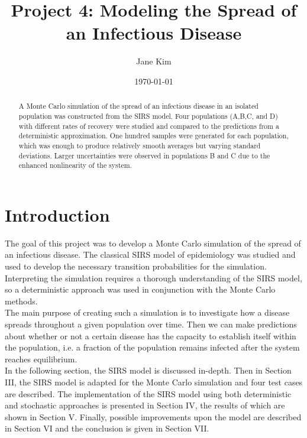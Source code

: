 \documentclass[prb,aps,twocolumn,showpacs,10pt]{revtex4-1}
\begin{document}
\title {Project 4: Modeling the Spread of an Infectious Disease}

\author{Jane Kim}
\date{\today}


\begin{abstract}
\vspace*{3mm}
A Monte Carlo simulation of the spread of an infectious disease in an isolated population was constructed from the SIRS model. Four populations (A,B,C, and D) with different rates of recovery were studied and compared to the predictions from a deterministic approximation. One hundred samples were generated for each population, which was enough to produce relatively smooth averages but varying standard deviations. Larger uncertainties were observed in populations B and C due to the enhanced nonlinearity of the system.
\end{abstract}

\maketitle

\section{Introduction}

The goal of this project was to develop a Monte Carlo simulation of the spread of an infectious disease. The classical SIRS model of epidemiology was studied and used to develop the necessary transition probabilities for the simulation. Interpreting the simulation requires a thorough understanding of the SIRS model, so a deterministic approach was used in conjunction with the Monte Carlo methods. \\

The main purpose of creating such a simulation is to investigate how a disease spreads throughout a given population over time. Then we can make predictions about whether or not a certain disease has the capacity to establish itself within the population, i.e. a fraction of the population remains infected after the system reaches equilibrium. \\

In the following section, the SIRS model is discussed in-depth. Then in Section III, the SIRS model is adapted for the Monte Carlo simulation and four test cases are described. The implementation of the SIRS model using both deterministic and stochastic approaches is presented in Section IV, the results of which are shown in Section V. Finally, possible improvements upon the model are described in Section VI and the conclusion is given in Section VII.\\
\end{document}
